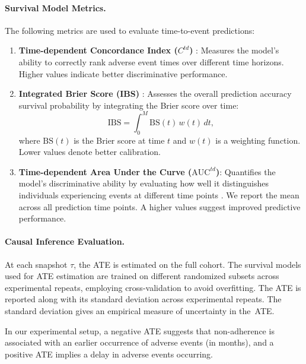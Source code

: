 \paragraph{Survival Model Metrics.}  
The following metrics are used to evaluate time-to-event predictions:
\begin{enumerate}[label=(\roman*),itemsep=0pt]
    \item \textbf{Time-dependent Concordance Index (\(C^{td}\))} \citep{antolini2005time}:  
    Measures the model’s ability to correctly rank adverse event times over different time horizons.
    Higher values indicate better discriminative performance.
    
    \item \textbf{Integrated Brier Score (IBS)} \citep{graf1999assessment}:  
    Assesses the overall prediction accuracy survival probability by integrating the Brier score over time:
    \[
    \text{IBS} = \int_{0}^{M} \text{BS}(t)\, w(t)\, dt,
    \]
    where \(\text{BS}(t)\) is the Brier score at time \(t\) and \(w(t)\) is a weighting function. Lower values denote better calibration.
    
    \item \textbf{Time-dependent Area Under the Curve (\(\text{AUC}^{td}\))}: Quantifies the model’s discriminative ability by evaluating how well it distinguishes individuals experiencing events at different time points \citep{uno2007evaluating}. 
    We report the mean across all prediction time points. 
    A higher values suggest improved predictive performance.
\end{enumerate}

\paragraph{Causal Inference Evaluation.}  
At each snapshot \(\tau\), the ATE is estimated on the full cohort.
The survival models used for ATE estimation are trained on different randomized subsets across experimental repeats, employing cross-validation to avoid overfitting. 
The ATE is reported along with its standard deviation across experimental repeats. The standard deviation gives an empirical measure of uncertainty in the~ATE.

In our experimental setup, a negative ATE suggests that non-adherence is associated with an earlier occurrence of adverse events (in months), and a positive ATE implies a delay in adverse events occurring.